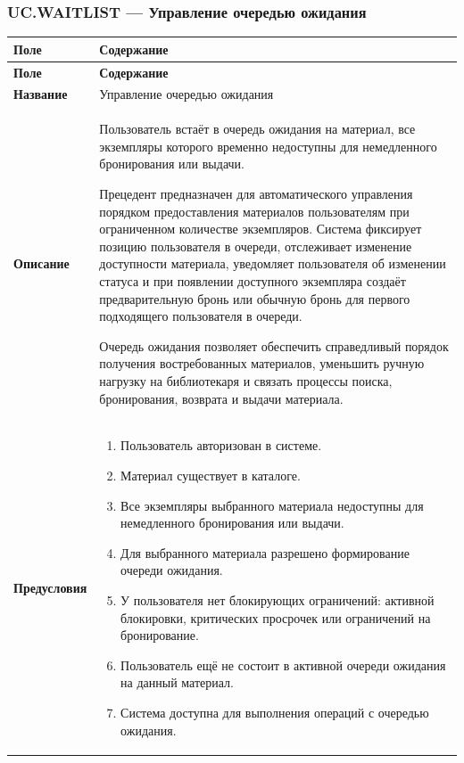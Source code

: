\documentclass[12pt,a4paper]{article}
\begin{document}
		\label{tab:uc-renewal-specification}
		\clearpage
		
		\subsubsection{UC.WAITLIST --- Управление очередью ожидания}
		
		\begin{xltabular}{\textwidth}{
				|>{\raggedright\arraybackslash}p{2.7cm}
				|>{\raggedright\arraybackslash}X|
			}
			\hline
			\textbf{Поле} & \textbf{Содержание} \\
			\hline
			\endfirsthead
			
			\hline
			\textbf{Поле} & \textbf{Содержание} \\
			\hline
			\endhead
			
			\hline
			\endfoot
			
			\textbf{Название} &
			Управление очередью ожидания \\
			\hline
			
			\textbf{Описание} &
			Пользователь встаёт в очередь ожидания на материал, все экземпляры
			которого временно недоступны для немедленного бронирования или
			выдачи.
			
			Прецедент предназначен для автоматического управления порядком
			предоставления материалов пользователям при ограниченном количестве
			экземпляров. Система фиксирует позицию пользователя в очереди,
			отслеживает изменение доступности материала, уведомляет пользователя
			об изменении статуса и при появлении доступного экземпляра создаёт
			предварительную бронь или обычную бронь для первого подходящего
			пользователя в очереди.
			
			Очередь ожидания позволяет обеспечить справедливый порядок получения
			востребованных материалов, уменьшить ручную нагрузку на библиотекаря
			и связать процессы поиска, бронирования, возврата и выдачи материала. \\
			\hline
			
			\textbf{Предусловия} &
			\begin{enumerate}
				\item Пользователь авторизован в системе.
				\item Материал существует в каталоге.
				\item Все экземпляры выбранного материала недоступны для
				немедленного бронирования или выдачи.
				\item Для выбранного материала разрешено формирование очереди
				ожидания.
				\item У пользователя нет блокирующих ограничений: активной
				блокировки, критических просрочек или ограничений на
				бронирование.
				\item Пользователь ещё не состоит в активной очереди ожидания на
				данный материал.
				\item Система доступна для выполнения операций с очередью ожидания.
			\end{enumerate} \\
			\hline
			

\end{xltabular}
\end{document}

